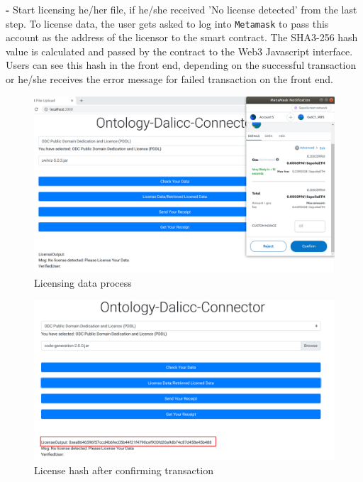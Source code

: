 \begin{itemize}
\begin{center}
\end{center}
    \textbf{- } Start licensing he/her file, if he/she received 'No license detected'  from the last step. To license data, the user gets asked to log into \texttt{Metamask} to pass this account as the address of the licensor to the smart contract. The SHA3-256 hash value is calculated and passed by the contract to the Web3 Javascript interface. Users can see this hash in the front end, depending on the successful transaction or he/she receives the error message for failed transaction on the front end.\\
    \begin{center}
	 \begin{figure}[htb!]
		\begin{minipage}{0.45\linewidth}
			\centering
			\includegraphics[width=1.95\textwidth]{images/chap03_license_data.png}
		\end{minipage}
		\caption[Licensing data process]{Licensing data process}
		
	\end{figure}
\end{center}
   \begin{center}
	\begin{figure}[htb!]
		
		\begin{minipage}{0.45\linewidth}
			\centering
			\includegraphics[width=1.95\textwidth]{images/chap03_license_hash.png}
		\end{minipage}
		\caption[License hash after confirming transaction]{License hash after confirming transaction}
		

\end{figure}
\end{center}
\end{itemize}
